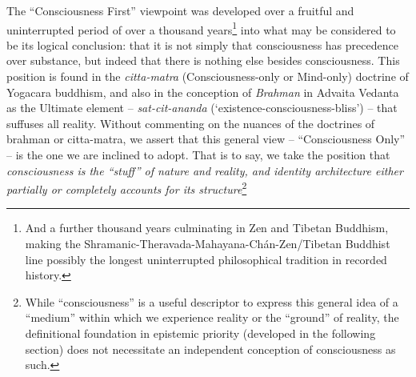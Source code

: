 \documentclass[pra,twocolumn,groupedaddress,10pt]{revtex4}
\theoremstyle{definition}
\begin{document}
The ``Consciousness First'' viewpoint was developed over a fruitful and uninterrupted period of over a thousand years\footnote{And a further thousand years culminating in Zen and Tibetan Buddhism, making the Shramanic-Theravada-Mahayana-Ch\'{a}n-Zen/Tibetan Buddhist line possibly the longest uninterrupted philosophical tradition in recorded history.} into what may be considered to be its logical conclusion: that it is not simply that consciousness has precedence over substance, but indeed that there is nothing else besides consciousness. This position is found in the \emph{citta-matra} (Consciousness-only or Mind-only) doctrine of Yogacara buddhism, and also in the conception of \emph{Brahman} in Advaita Vedanta as the Ultimate element -- \emph{sat-cit-ananda} (`existence-consciousness-bliss') -- that suffuses all reality\cite{waite}. Without commenting on the nuances of the doctrines of brahman or citta-matra, we assert that this general view -- ``Consciousness Only'' -- is the one we are inclined to adopt. That is to say, we take the position that \emph{consciousness is the ``stuff'' of nature and reality, and identity architecture either partially or completely accounts for its structure}\footnote{While ``consciousness'' is a useful descriptor to express this general idea of a ``medium'' within which we experience reality or the ``ground'' of reality, the definitional foundation in epistemic priority (developed in the following section) does not necessitate an independent conception of consciousness as such.}
\end{document}
